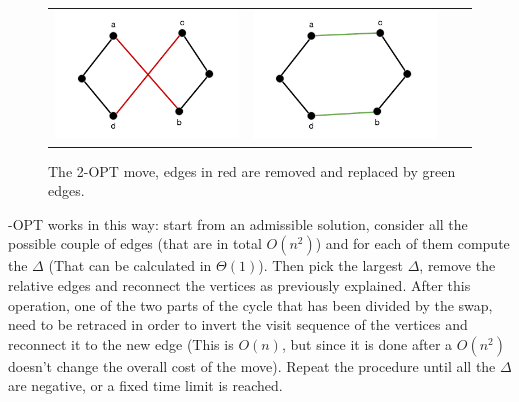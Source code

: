 \begin{figure}[h!]
\centering
	\begin{tabular}{@{}cccc@{}}
		\includegraphics[scale=0.6]{media/twopt1.pdf} &
		\includegraphics[scale=0.6]{media/twopt2.pdf} \\
	\end{tabular}
	\caption{The 2-OPT move, edges in red are removed and replaced by green edges.}
	\label{fig:twoopt}
\end{figure}

-OPT works in this way: start from an admissible solution, consider all the possible couple of edges (that are in total $O(n^2)$) and for each of them compute the $\Delta$ (That can be calculated in $\Theta(1)$). Then pick the largest $\Delta$, remove the relative edges and reconnect the vertices as previously explained. After this operation, one of the two parts of the cycle that has been divided by the swap, need to be retraced in order to invert the visit sequence of the vertices and reconnect it to the new edge (This is $O(n)$, but since it is done after a $O(n^2)$ doesn't change the overall cost of the move). Repeat the procedure until all the $\Delta$ are negative, or a fixed time limit is reached.\\

